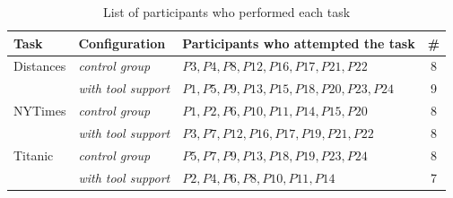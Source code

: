 


\begin{table}[h!]
\centering
\caption{List of participants who performed each task}
\begin{footnotesize}
\begin{tabular}{lllc}
\hline
\textbf{Task} & \textbf{Configuration} & \textbf{Participants who attempted the task} & \textbf{\#}                                                                              \\
\hline
\hline
%
%
\parbox[l][0.5cm][c]{1cm}{Distances}
& \textit{control group}        & $P3, P4, P8, P12, P16, P17,  P21, P22$  & 8 \\
\parbox[l][0.5cm][c]{1cm}{}
& \textit{with tool support}    & $P1, P5, P9, P13, P15, P18, P20, P23, P24$ & 9 \\
\hline
%
%
\parbox[l][0.5cm][c]{1cm}{NYTimes}
& \textit{control group}     & $P1, P2, P6, P10, P11, P14, P15, P20$ & 8 \\
\parbox[l][0.5cm][c]{1cm}{}
& \textit{with tool support} & $P3, P7, P12, P16, P17, P19, P21,  P22$ & 8 \\
\hline
%
%
\parbox[l][0.5cm][c]{1cm}{Titanic}       
& \textit{control group}     & $P5, P7, P9, P13, P18, P19, P23, P24$ & 8 \\
\parbox[l][0.5cm][c]{1cm}{}
& \textit{with tool support} & $P2, P4, P6, P8, P10, P11,  P14$ & 7 \\
\hline
%
%
\end{tabular}
\end{footnotesize}
\smallskip
\label{tbl:python-task-distribution}
\end{table}

    




